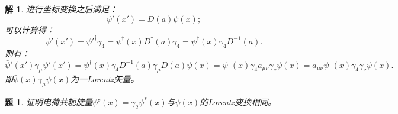 \documentclass[UTF8,10pt,a4paper]{article}
\theoremstyle{Problem}%
\newtheorem{prob}{题}%
\theoremstyle{Solution}%
\newtheorem*{sol}{解}%
\begin{document}
\begin{sol}
进行坐标变换之后满足：
\[
    \psi'(x') = D(a) \psi(x);
\]
可以计算得：
\[
    \bar{\psi}'(x') = \psi'^\dagger \gamma_4 = \psi^\dagger(x) D^\dagger(a)\gamma_4 = \psi^\dagger(x) \gamma_4 D^{-1}(a).
\]
则有：
\[
    \bar{\psi}'(x') \gamma_\mu \psi'(x') = \psi^\dagger(x) \gamma_4 D^{-1}(a)\gamma_\mu D(a) \psi(x) = \psi^\dagger(x) \gamma_4 a_{\mu\nu}\gamma_\nu \psi(x) = a_{\mu\nu} \psi^\dagger(x) \gamma_4 \gamma_\nu \psi(x).
\]
即$\bar{\psi}(x)\gamma_\mu\psi(x)$为一Lorentz矢量。
\end{sol}


\begin{prob}证明电荷共轭旋量$\psi^c(x) = \gamma_2\psi^*(x)$与$\psi(x)$的Lorentz变换相同。


\end{prob}
\end{document}
